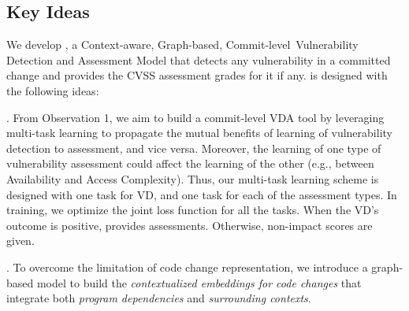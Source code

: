 \subsection{Key Ideas}
\label{key-ideas:sec}

We develop {\tool}, a Context-aware, Graph-based,
Commit-level~Vulnerability Detection and Assessment Model that detects
any vulnerability in a committed change and provides the CVSS
assessment grades for it if any.  {\tool} is designed with the
following ideas:

\vspace{1pt} . From Observation 1, we
aim to build a commit-level VDA tool by leveraging multi-task
learning to propagate the mutual benefits of learning of vulnerability
detection to assessment, and vice versa. Moreover, the learning of one
type of vulnerability assessment could affect the learning of the
other (e.g., between Availability and Access Complexity). Thus, our
multi-task learning scheme is designed with one task for VD, and one
task for each of the assessment types. In training, we optimize
the joint loss function for all the tasks. When the VD's outcome is
positive, {\tool} provides assessments. Otherwise,
non-impact scores are given.


\vspace{1pt}
. To overcome
the limitation of code change representation, we introduce a
graph-based model to build the {\em
contextualized embeddings for code changes} that integrate both {\em
program dependencies} and {\em surrounding contexts}.

